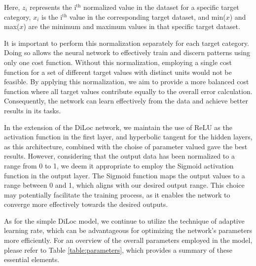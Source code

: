 \documentclass[a4paper, UKenglish, 11pt]{uiomaster}
\begin{document}
Here, $z_i$ represents the i$^{\text{th}}$ normalized value in the dataset for a specific target category, $x_i$ is the i$^{\text{th}}$ value in the corresponding target dataset, and min($x$) and max($x$) are the minimum and maximum values in that specific target dataset.

It is important to perform this normalization separately for each target category. Doing so allows the neural network to effectively train and discern patterns using only one cost function. Without this normalization, employing a single cost function for a set of different target values with distinct units would not be feasible. By applying this normalization, we aim to provide a more balanced cost function where all target values contribute equally to the overall error calculation. Consequently, the network can learn effectively from the data and achieve better results in its tasks.

In the extension of the DiLoc network, we maintain the use of ReLU as the activation function in the first layer, and hyperbolic tangent for the hidden layers, as this architecture, combined with the choise of parameter valued gave the best results. However, considering that the output data has been normalized to a range from 0 to 1, we deem it appropriate to employ the Sigmoid activation function in the output layer. The Sigmoid function maps the output values to a range between 0 and 1, which aligns with our desired output range. This choice may potentially facilitate the training process, as it enables the network to converge more effectively towards the desired outputs. %

As for the simple DiLoc model, we continue to utilize the technique of adaptive learning rate, which can be advantageous for optimizing the network's parameters more efficiently. For an overview of the overall parameters employed in the model, please refer to Table \ref{table:parameters}, which provides a summary of these essential elements.
\end{document}
